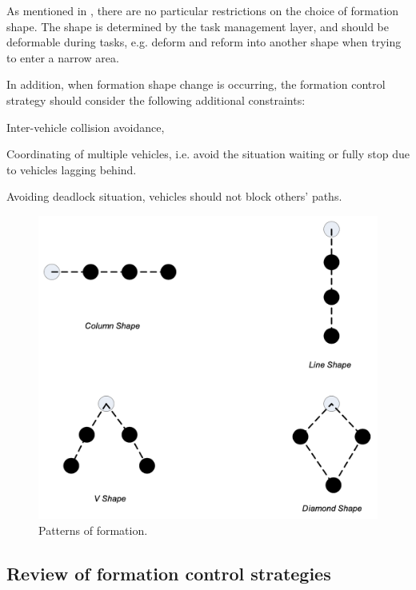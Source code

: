 \documentclass[letterpaper,12pt]{article}
\begin{document}
As mentioned in \cite{liu_bucknall_2018}, there are no particular restrictions on the choice of formation shape. The shape is determined by the task management layer, and should be deformable during tasks, e.g. deform and reform into another shape when trying to enter a narrow area.

In addition, when formation shape change is occurring, the formation control strategy should consider the following additional constraints: 

\begin{compactenum}
	\item Inter-vehicle collision avoidance,
	\item Coordinating of multiple vehicles, i.e. avoid the situation waiting or fully stop due to vehicles lagging behind.
	\item Avoiding deadlock situation, vehicles should not block others' paths.
\end{compactenum}

\begin{figure}
	\centering
	\includegraphics[width=5in]{patternsformation.png}
	\caption{Patterns of formation.}
	\label{fig:patternsformation} 
\end{figure}

\subsection{Review of formation control strategies}
\end{document}
